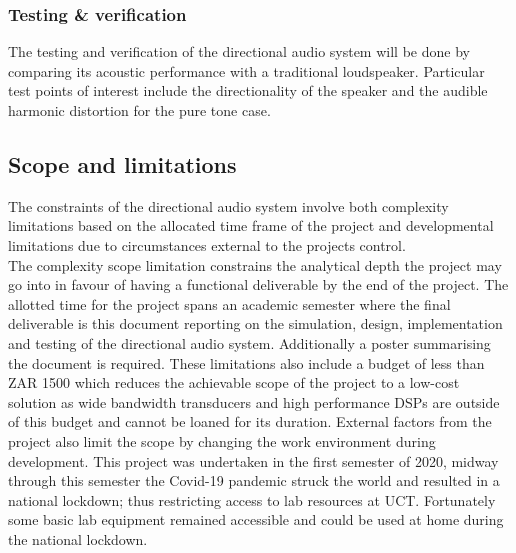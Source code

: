 \subsubsection{Testing \& verification}
The testing and verification of the directional audio system will be done by comparing its acoustic performance with a traditional loudspeaker. Particular test points of interest include the directionality of the speaker and the audible harmonic distortion for the pure tone case.

\subsection{Scope and limitations}
The constraints of the directional audio system involve both complexity limitations based on the allocated time frame of the project and developmental limitations due to circumstances external to the projects control.\\
The complexity scope limitation constrains the analytical depth the project may go into in favour of having a functional deliverable by the end of the project. The allotted time for the project spans an academic semester where the final deliverable is this document reporting on the simulation, design, implementation and testing of the directional audio system. Additionally a poster summarising the document is required.
These limitations also include a budget of less than ZAR 1500 which reduces the achievable scope of the project to a low-cost solution as wide bandwidth transducers and high performance DSPs are outside of this budget and cannot be loaned for its duration.
External factors from the project also limit the scope by changing the work environment during development. This project was undertaken in the first semester of 2020, midway through this semester the Covid-19 pandemic struck the world and resulted in a national lockdown; thus restricting access to lab resources at UCT. Fortunately some basic lab equipment remained accessible and could be used at home during the national lockdown.
\newpage
